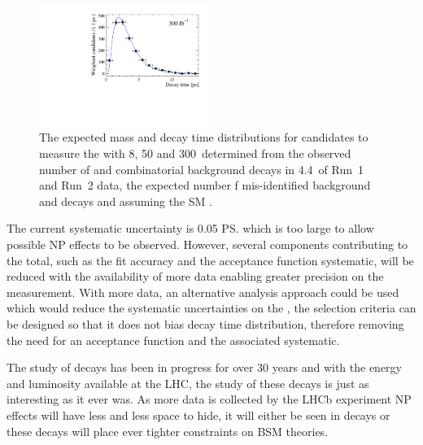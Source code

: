 \begin{figure}[tbp]
        \includegraphics[width=0.49\textwidth]{./Figs/Summary/300fb_time.pdf}
    \caption{The expected mass and decay time distributions for \bsmumu candidates to measure the \el with 8, 50 and 300~\fb determined from the observed number of \bsmumu and combinatorial background decays in 4.4~\fb of Run~1 and Run~2 data, the expected number f mis-identified background and \bdmumu decays and assuming the SM \bsmumu \BF.}
    \label{fig:expected_dist}
\end{figure}





The current systematic uncertainty is 0.05 \ps which is too large to allow possible NP effects to be observed. However, several components contributing to the total, such as the fit accuracy and the acceptance function systematic, will be reduced with the availability of more data enabling greater precision on the measurement. With more data, an alternative analysis approach could be used which would reduce the systematic uncertainties on the \el, the selection criteria can be designed so that it does not bias \bsmumu decay time distribution, therefore removing the need for an acceptance function and the associated systematic.


The study of \bmumu decays has been in progress for over 30 years and with the energy and luminosity available at the LHC, the study of these decays is just as interesting as it ever was. As more data is collected by the LHCb experiment NP effects will have less and less space to hide, it will either be seen in \bmumu decays or these decays will place ever tighter constraints on BSM theories. 
